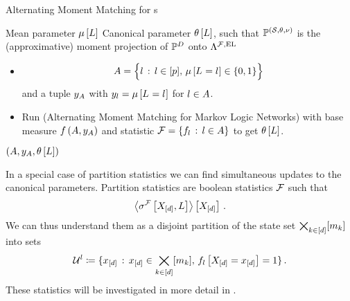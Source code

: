 \begin{algorithm}[hbt!]
    \caption{Alternating Moment Matching for \HybridLogicNetwork{}s}\label{alg:AMM_HLN}
    \begin{algorithmic}
        \Require Mean parameter $\mu\left[L\right]$
        \Ensure Canonical parameter $\theta\left[L\right]$, such that $\mathbb{P}^{(\mathcal{S},\theta,\nu)}$ is the (approximative) moment projection of $\mathbb{P}^{D}$ onto $\Lambda^{\mathcal{F},\mathrm{EL}}$
        \iosepline
        \State
        \begin{itemize}
            \item
            \begin{align*}
                A = \Big\{ l \,:\, l\in[p] ,\, \mu\left[L_{}=l_{}\right]\in\{0,1\} \Big\}
            \end{align*}
            and a tuple $y_{A}$ with $y_{l}=\mu\left[L_{}=l_{}\right]$ for $l\in A$.
            \item
            Run  (Alternating Moment Matching for Markov Logic Networks) with base measure $f\left(A,y_{A}\right)$ and statistic $\mathcal{F}=\{f_{l}\,:\,l\in A\}$ to get $\theta\left[L\right]$.
        \end{itemize}
        \State \Return $(A,y_{A},\theta\left[L\right])$
    \end{algorithmic}
\end{algorithm}



In a special case of partition statistics we can find simultaneous updates to the canonical parameters.
Partition statistics are boolean statistics $\mathcal{F}$ such that
\begin{align*}
    \left\langle \sigma^{\mathcal{F}}\left[X_{[d]},L\right]\right\rangle \left[ X_{[d]} \right] \, .
\end{align*}
We can thus understand them as a disjoint partition of the state set $\bigtimes_{k\in[d]}[m_{k}]$ into sets
\begin{align*}
    \mathcal{U}^{l} \coloneqq \{x_{[d]}\,:\,x_{[d]}\in\bigtimes_{k\in[d]}[m_{k}],\,f_{l}\left[X_{[d]}=x_{[d]}\right]=1\} \, .
\end{align*}
These statistics will be investigated in more detail in .

